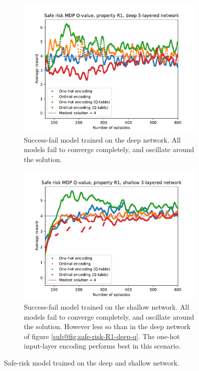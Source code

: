\begin{figure}
    \centering
    \begin{subfigure}[b]{0.9\textwidth}
        \centering
        \includegraphics[width=\textwidth]{plot/safe-risk-R1-q.pdf}
        \caption{Success-fail model trained on the deep network. All models fail to converge completely, and oscillate around the solution.}
        \label{fig:safe-risk-R1-deep-q}
    \end{subfigure}
    \vfill
    \begin{subfigure}[b]{0.9\textwidth}
        \centering
        \includegraphics[width=\textwidth]{plot/safe-risk-R1-fc128-q.pdf}
        \caption{Success-fail model trained on the shallow network. All models fail to converge completely, and oscillate around the solution. However less so than in the deep network of figure \ref{sub@fig:safe-risk-R1-deep-q}. The one-hot input-layer encoding performs best in this scenario.}
        \label{fig:safe-risk-R1-shallow-q}
    \end{subfigure}
    \caption{Safe-risk model trained on the deep and shallow network.}
    \label{fig:safe-risk-R1-q}
\end{figure}

